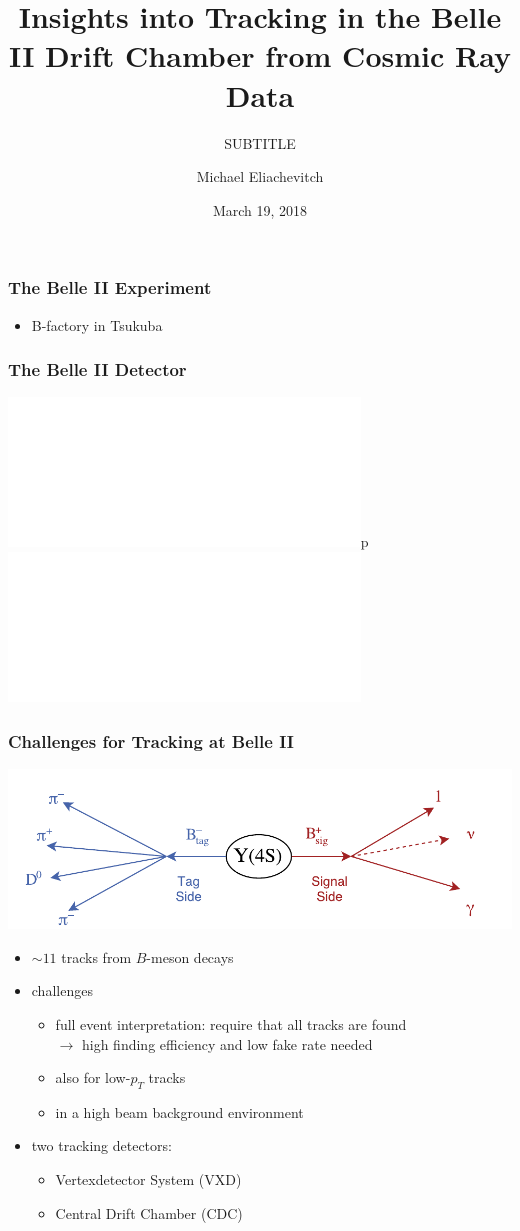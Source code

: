 \documentclass[18pt]{beamer}
\title{Insights into Tracking in the Belle II Drift Chamber from Cosmic Ray Data}
\subtitle{SUBTITLE}
\author{Michael Eliachevitch}
\date{March 19, 2018}
\institute{ETP - KIT}
\begin{document}
  
  \begin{frame}
  \titlepage
\end{frame}

\begin{frame}
  \frametitle{The Belle II Experiment}
  \begin{itemize}
  \item B-factory in Tsukuba
  \end{itemize}

\end{frame}

\begin{frame}
  \frametitle{The Belle II Detector}
  \centering
  \includegraphics<1>[width=0.7\textwidth]{figures/belle2_detector_mylabels.pdf}p
  \includegraphics<2->[width=0.7\textwidth]{figures/belle2_detector_mylabels_cdchighlight.pdf}
\end{frame}

\begin{frame}
  \frametitle{Challenges for Tracking at Belle II}
  \includegraphics[width=.5\textwidth]{figures/Y4S_tagsig.pdf}
  \begin{itemize}
  \item $\sim 11$ tracks from $B$-meson decays
  \item challenges
    \begin{itemize}
    \item full event interpretation: require that all tracks are found\\
      $\rightarrow$ high finding efficiency and low fake rate needed
    \item also for low-$p_T$ tracks
    \item in a high beam background environment
    \end{itemize}
  \item two tracking detectors:
    \begin{itemize}
    \item Vertexdetector System (VXD)
    \item Central Drift Chamber (CDC)
    \end{itemize}
  \end{itemize}
\end{frame}
\end{document}
